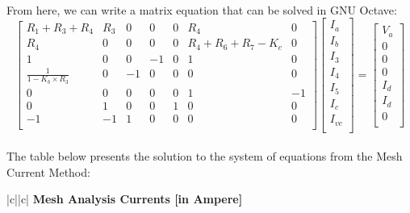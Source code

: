 \paragraph{}
From here, we can write a matrix equation that can be solved in GNU Octave:
\[
\begin{bmatrix}
R_1+R_3+R_4 & R_3 & 0 & 0 & 0 & R_4 & 0\\
R_4 & 0 & 0 & 0 & 0 & R_4+R_6+R_7-K_c & 0\\ 
1 & 0 & 0 & -1 & 0 & 1 & 0\\
\frac{1}{1-K_b \times R_3} & 0 & -1 & 0 & 0 & 0 & 0\\
0 & 0 & 0 & 0 & 0 & 1 & -1\\
0 & 1 & 0 & 0 & 1 & 0 & 0\\ 
-1 & -1 & 1 & 0 & 0 & 0 & 0\\ 
\end{bmatrix}
\begin{bmatrix}
I_a\\
I_b\\
I_3\\
I_4\\
I_5\\
I_c\\
I_{vc}\\
\end{bmatrix}
=
\begin{bmatrix}
V_a\\
0\\
0\\
0\\
I_{d}\\
I_{d}\\
0\\
\end{bmatrix}
\]

\paragraph{}
The table below presents the solution to the system of equations from the Mesh Current Method:
\begin{center}
\begin{tabular}{|c||c|}
      \hline    
       {\bf Mesh Analysis Currents [in Ampere]} \\
      \hline

	
     
      \end{tabular}
     
      
\end{center}
 


